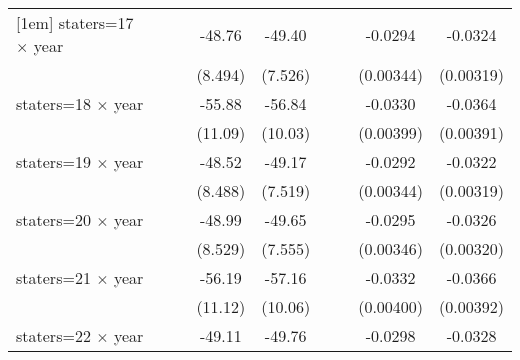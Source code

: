 {\begin{longtable}{l*{8}{c}}
[1em]
staters=17 $\times$ year&                     &                     &      -48.76\sym{***}&      -49.40\sym{***}&                     &                     &     -0.0294\sym{***}&     -0.0324\sym{***}\\
                    &                     &                     &     (8.494)         &     (7.526)         &                     &                     &   (0.00344)         &   (0.00319)         \\
[1em]
staters=18 $\times$ year&                     &                     &      -55.88\sym{***}&      -56.84\sym{***}&                     &                     &     -0.0330\sym{***}&     -0.0364\sym{***}\\
                    &                     &                     &     (11.09)         &     (10.03)         &                     &                     &   (0.00399)         &   (0.00391)         \\
[1em]
staters=19 $\times$ year&                     &                     &      -48.52\sym{***}&      -49.17\sym{***}&                     &                     &     -0.0292\sym{***}&     -0.0322\sym{***}\\
                    &                     &                     &     (8.488)         &     (7.519)         &                     &                     &   (0.00344)         &   (0.00319)         \\
[1em]
staters=20 $\times$ year&                     &                     &      -48.99\sym{***}&      -49.65\sym{***}&                     &                     &     -0.0295\sym{***}&     -0.0326\sym{***}\\
                    &                     &                     &     (8.529)         &     (7.555)         &                     &                     &   (0.00346)         &   (0.00320)         \\
[1em]
staters=21 $\times$ year&                     &                     &      -56.19\sym{***}&      -57.16\sym{***}&                     &                     &     -0.0332\sym{***}&     -0.0366\sym{***}\\
                    &                     &                     &     (11.12)         &     (10.06)         &                     &                     &   (0.00400)         &   (0.00392)         \\
[1em]
staters=22 $\times$ year&                     &                     &      -49.11\sym{***}&      -49.76\sym{***}&                     &                     &     -0.0298\sym{***}&     -0.0328\sym{***}\\

\end{longtable}}

